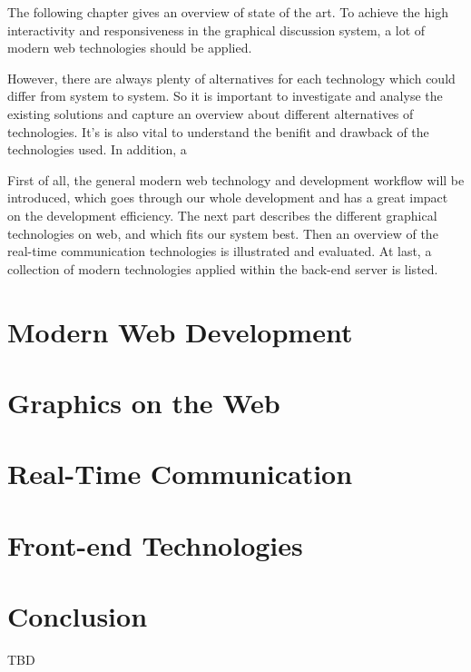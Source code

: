 The following chapter gives an overview of state of the art. To achieve the high interactivity and responsiveness in the graphical discussion system, a lot of modern web technologies should be applied.

However, there are always plenty of alternatives for each technology which could differ from system to system. So it is important to investigate and analyse the existing solutions and capture an overview about different alternatives of technologies. It's is also vital to understand the benifit and drawback of the technologies used. In addition, a

First of all, the general modern web technology and development workflow will be introduced, which goes through our whole development and has a great impact on the development efficiency. The next part describes the different graphical technologies on web, and which fits our system best. Then an overview of the real-time communication technologies is illustrated and evaluated. At last, a collection of modern technologies applied within the back-end server is listed.

\section{Modern Web Development}

\section{Graphics on the Web}
 \label{graphics-section}
\section{Real-Time Communication}

\section{Front-end Technologies}

% 


\section{Conclusion}

TBD